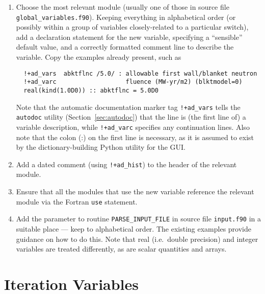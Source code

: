\begin{enumerate}

\item Choose the most relevant module (usually one of those in source file
  \texttt{global\_variables.f90}). Keeping everything in alphabetical order
  (or possibly within a group of variables closely-related to a particular
  switch), add a declaration statement for the new variable, specifying a
  ``sensible'' default value, and a correctly formatted comment line to
  describe the variable. Copy the examples already present, such as
\begin{verbatim}
  !+ad_vars  abktflnc /5.0/ : allowable first wall/blanket neutron
  !+ad_varc                   fluence (MW-yr/m2) (blktmodel=0)
  real(kind(1.0D0)) :: abktflnc = 5.0D0
\end{verbatim}
  Note that the automatic documentation marker tag \verb.!+ad_vars. tells the
  \texttt{autodoc} utility (Section~\ref{sec:autodoc}) that the line is (the
  first line of) a variable description, while \verb.!+ad_varc. specifies any
  continuation lines. Also note that the colon (:) on the first line is
  necessary, as it is assumed to exist by the dictionary-building Python
  utility for the GUI\@.

\item Add a dated comment (using \verb.!+ad_hist.) to the header of the
  relevant module.

\item Ensure that all the modules that use the new variable reference the
  relevant module via the Fortran \texttt{use} statement.

\item Add the parameter to routine \texttt{PARSE\_INPUT\_FILE} in source file
  \texttt{input.f90} in a suitable place --- keep to alphabetical order. The
  existing examples provide guidance on how to do this. Note that real (i.e.\
  double precision) and integer variables are treated differently, as are
  scalar quantities and arrays.


\end{enumerate}

\section{Iteration Variables}

